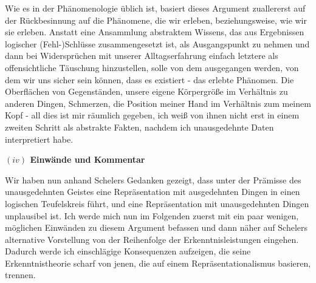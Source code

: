 \documentclass[a4paper, 12pt]{article}
\begin{document}
\begin{onehalfspace}

Wie es in der Phänomenologie üblich ist, basiert dieses Argument zuallererst auf der Rück\-be\-sinnung auf die Phänomene, die wir erleben, beziehungsweise, wie wir sie erleben. Anstatt eine Ansammlung abstraktem Wissens, das aus Ergebnissen logischer (Fehl-)Schlüsse zusammengesetzt ist, als Ausgangspunkt zu nehmen und dann bei Widersprüchen mit unserer Alltagserfahrung einfach letztere als offensichtliche Täuschung hinzustellen, solle von dem ausgegangen werden, von dem wir uns sicher sein können, dass es existiert - das erlebte Phänomen. Die Oberflächen von Gegenständen, unsere eigene Körpergröße im Verhältnis zu anderen Dingen, Schmerzen, die Position meiner Hand im Verhältnis zum meinem Kopf - all dies ist mir räumlich gegeben, ich weiß von ihnen nicht erst in einem zweiten Schritt als abstrakte Fakten, nachdem ich unausgedehnte Daten interpretiert habe.

\vspace{5mm}
\noindent\textbf{$(iv)$ Einwände und Kommentar} 


\noindent Wir haben nun anhand Schelers Gedanken gezeigt, dass unter der Prämisse des unausgedehnten Geistes eine Repräsentation mit ausgedehnten Dingen in einen logischen Teufelskreis führt, und eine Repräsentation mit unausgedehnten Dingen unplausibel ist. Ich werde mich nun im Folgenden zuerst mit ein paar wenigen, möglichen Einwänden zu diesem Argument befassen und dann näher auf Schelers alternative Vorstellung von der Reihenfolge der Erkenntnisleistungen eingehen. Dadurch werde ich einschlägige Konsequenzen aufzeigen, die seine Erkenntnistheorie scharf von jenen, die auf einem Repräsentationalismus basieren, trennen.



\end{onehalfspace}
\end{document}
